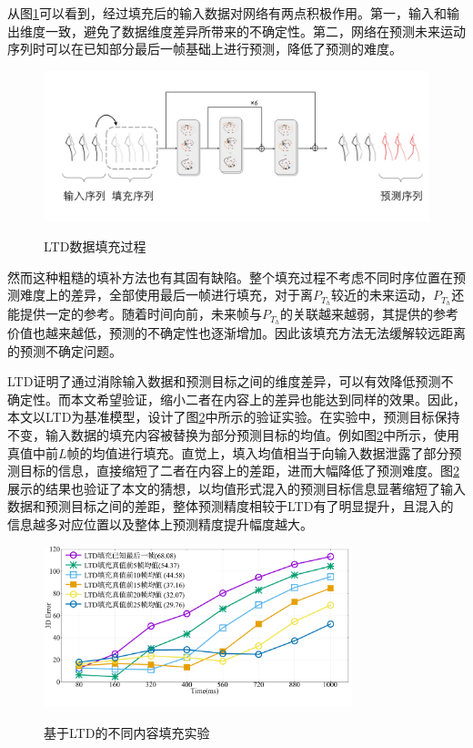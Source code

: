 从图\ref{fig:LTD_padding}可以看到，经过填充后的输入数据对网络有两点积极作用。第一，输入和输出维度一致，避免了数据维度差异所带来的不确定性。第二，网络在预测未来运动序列时可以在已知部分最后一帧基础上进行预测，降低了预测的难度。
\begin{figure}[ht]
    \centering
    \includegraphics[width=1\textwidth]{FigMa/LTD_padding.png}\\
    \vspace{-0.3cm}
    \caption{LTD数据填充过程}
    \label{fig:LTD_padding}
\end{figure}
然而这种粗糙的填补方法也有其固有缺陷。整个填充过程不考虑不同时序位置在预测难度上的差异，全部使用最后一帧进行填充，对于离$P_{T_h}$较近的未来运动，$P_{T_h}$还能提供一定的参考。随着时间向前，未来帧与$P_{T_h}$的关联越来越弱，其提供的参考价值也越来越低，预测的不确定性也逐渐增加。因此该填充方法无法缓解较远距离的预测不确定问题。

LTD证明了通过消除输入数据和预测目标之间的维度差异，可以有效降低预测不确定性。而本文希望验证，缩小二者在内容上的差异也能达到同样的效果。因此，本文以LTD为基准模型，设计了图\ref{fig:toy_experiment}中所示的验证实验。在实验中，预测目标保持不变，输入数据的填充内容被替换为部分预测目标的均值。例如图\ref{fig:toy_experiment}中所示，使用真值中前$L$帧的均值进行填充。直觉上，填入均值相当于向输入数据泄露了部分预测目标的信息，直接缩短了二者在内容上的差距，进而大幅降低了预测难度。图\ref{fig:toy_experiment}展示的结果也验证了本文的猜想，以均值形式混入的预测目标信息显著缩短了输入数据和预测目标之间的差距，整体预测精度相较于LTD有了明显提升，且混入的信息越多对应位置以及整体上预测精度提升幅度越大。

\begin{figure}[h]
    \centering
    \includegraphics[width=0.8\textwidth]{FigMa/padding_chinese.pdf}\\
    \vspace{-0.3cm}
    \caption{基于LTD的不同内容填充实验}
    \label{fig:toy_experiment}
\end{figure}

